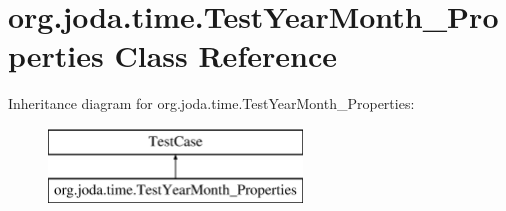 \hypertarget{classorg_1_1joda_1_1time_1_1_test_year_month___properties}{\section{org.\-joda.\-time.\-Test\-Year\-Month\-\_\-\-Properties Class Reference}
\label{classorg_1_1joda_1_1time_1_1_test_year_month___properties}
}
Inheritance diagram for org.\-joda.\-time.\-Test\-Year\-Month\-\_\-\-Properties\-:\begin{figure}[H]
\begin{center}
\leavevmode
\includegraphics[height=2.000000cm]{classorg_1_1joda_1_1time_1_1_test_year_month___properties}
\end{center}
\end{figure}
